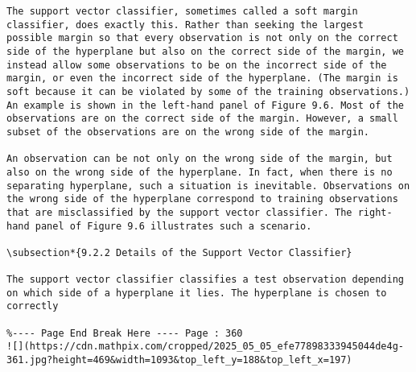 \documentclass[10pt]{article}
\begin{document}
\begin{verbatim}
The support vector classifier, sometimes called a soft margin classifier, does exactly this. Rather than seeking the largest possible margin so that every observation is not only on the correct side of the hyperplane but also on the correct side of the margin, we instead allow some observations to be on the incorrect side of the margin, or even the incorrect side of the hyperplane. (The margin is soft because it can be violated by some of the training observations.) An example is shown in the left-hand panel of Figure 9.6. Most of the observations are on the correct side of the margin. However, a small subset of the observations are on the wrong side of the margin.

An observation can be not only on the wrong side of the margin, but also on the wrong side of the hyperplane. In fact, when there is no separating hyperplane, such a situation is inevitable. Observations on the wrong side of the hyperplane correspond to training observations that are misclassified by the support vector classifier. The right-hand panel of Figure 9.6 illustrates such a scenario.

\subsection*{9.2.2 Details of the Support Vector Classifier}

The support vector classifier classifies a test observation depending on which side of a hyperplane it lies. The hyperplane is chosen to correctly

%---- Page End Break Here ---- Page : 360
![](https://cdn.mathpix.com/cropped/2025_05_05_efe77898333945044de4g-361.jpg?height=469&width=1093&top_left_y=188&top_left_x=197)


\end{verbatim}
\end{document}
